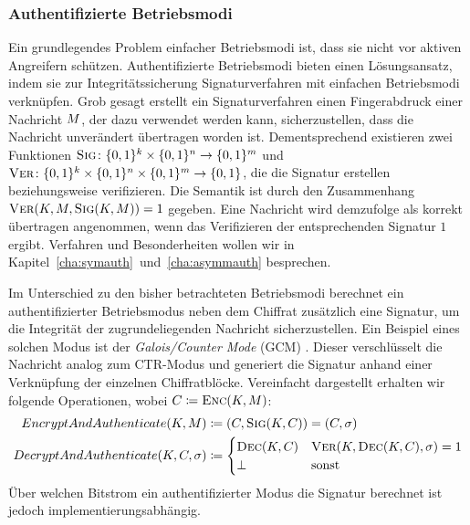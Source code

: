 \subsubsection{Authentifizierte Betriebsmodi}\label{sssec:gcm} 
Ein grundlegendes Problem einfacher Betriebsmodi ist, dass sie nicht vor
aktiven Angreifern schützen. Authentifizierte
Betriebsmodi bieten
einen Lösungsansatz, indem sie zur Integritätssicherung
Signaturverfahren \indexSig mit einfachen Betriebsmodi verknüpfen. 
 Grob gesagt erstellt ein Signaturverfahren einen Fingerabdruck einer
Nachricht $M$, der dazu verwendet werden kann, sicherzustellen,
dass die Nachricht unverändert übertragen worden ist. Dementsprechend
existieren zwei Funktionen $\textsc{Sig} \colon \{0,1\}^k \times \{0,1\}^n
\rightarrow \{0,1\}^m$ und $\textsc{Ver} \colon \{0,1\}^k \times \{0,1\}^n
\times \{0,1\}^m \rightarrow \{0,1\}$, die die Signatur erstellen
beziehungsweise verifizieren. Die Semantik ist durch den Zusammenhang
$\textsc{Ver}(K,M,\textsc{Sig}(K, M)) = 1$ gegeben. Eine Nachricht
wird demzufolge als korrekt übertragen angenommen, wenn das Verifizieren
der entsprechenden Signatur $1$ ergibt.
Verfahren und Besonderheiten wollen wir in
Kapitel~\ref{cha:symauth}~und~\ref{cha:asymmauth} besprechen. 

Im Unterschied zu den bisher betrachteten Betriebsmodi berechnet ein
authentifizierter Betriebsmodus neben dem Chiffrat zusätzlich eine
Signatur, um die Integrität der zugrundeliegenden Nachricht
sicherzustellen. Ein Beispiel eines solchen Modus ist der
\emph{Galois/Counter Mode} (GCM) \cite{NIST_GCM05}. Dieser verschlüsselt
die Nachricht analog zum CTR-Modus und generiert die Signatur anhand
einer Verknüpfung der einzelnen Chiffratblöcke. Vereinfacht dargestellt
erhalten wir folgende Operationen, wobei $C \coloneqq \textsc{Enc}(K,
M)$:
\begin{align*}
  EncryptAndAuthenticate(K, M) &\coloneqq (C, \textsc{Sig}(K, C)) = (C, \sigma)\\
  DecryptAndAuthenticate(K, C, \sigma) &\coloneqq \begin{cases}
    \textsc{Dec}(K, C) & \textsc{Ver}(K, \textsc{Dec}(K, C), \sigma) = 1 \\
    \bot & \textnormal{sonst}
  \end{cases}
\end{align*}
Über welchen Bitstrom ein authentifizierter Modus die Signatur berechnet
ist jedoch implementierungsabhängig. 

